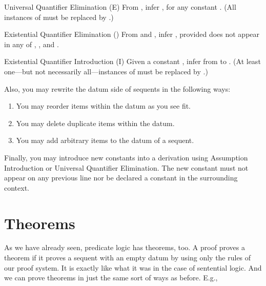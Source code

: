 \begin{infrule}
 \item[Universal Quantifier Elimination (\p{\lforall}E)] From \p{\seq{\Lambda}
  {\lforall\upsilon\phi(\upsilon)}}, infer \p{\seq{\Lambda}{\phi(\kappa)}}, for 
  any constant \p{\kappa}. (All instances of \p{\upsilon} must be replaced by 
  \p{\kappa}.)
 
 \item[Existential Quantifier Elimination (\exE)] From  and , infer , provided \p{\kappa} does not 
  appear in any of , , and \p{\psi}.

 \item[Existential Quantifier Introduction (\p{\lthereis}I)] Given a constant 
  \p{\kappa}, infer from \p{\seq{\Lambda}
 {\phi(\kappa)}} to \p{\seq{\Lambda}\lthereis\upsilon\phi(\upsilon)}. (At least 
 one---but not necessarily all---instances of \p{\kappa} must be replaced by 
 \p{\upsilon}.)

\end{infrule}


Also, you may rewrite the datum side of sequents in the following ways:

\begin{enumerate}
 \renewcommand{\labelenumi}{\alph{enumi}.}
 
 \item You may reorder items within the datum as you see fit.

 \item You may delete duplicate items within the datum.

 \item You may add arbitrary items to the datum of a sequent.

\end{enumerate}

Finally, you may introduce new constants into a derivation using Assumption 
Introduction or Universal Quantifier Elimination. The new constant must not 
appear on any previous line nor be declared a constant in the surrounding 
context.



\section{Theorems}\label{sec:theoremsPL}

As we have already seen, predicate logic has theorems, too.  A proof proves a 
theorem if it proves a sequent with an empty datum by using only the rules of 
our proof system. It is exactly like what it was in the case of sentential 
logic. And we can prove theorems in just the same sort of ways as before. E.g., 

